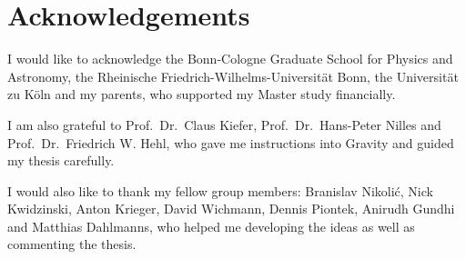 \chapter{Acknowledgements}
\label{chap:ack}

I would like to acknowledge the Bonn-Cologne Graduate School for Physics and 
Astronomy, the Rheinische Friedrich-Wilhelms-Universität Bonn, the Universität 
zu Köln and my parents, who supported my Master study financially.

I am also grateful to Prof.\ Dr.\ Claus Kiefer, Prof.\ Dr.\ Hans-Peter Nilles 
and Prof.\ Dr.\ Friedrich W. Hehl, who gave me instructions into Gravity and 
guided my thesis carefully.

I would also like to thank my fellow group members: Branislav Nikolić, Nick 
Kwidzinski, Anton Krieger, David Wichmann, Dennis Piontek, Anirudh Gundhi and 
Matthias Dahlmanns, who helped me developing the ideas as well as commenting 
the thesis.







